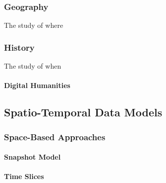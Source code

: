 \subsubsection{Geography} %
\label{ssub:geography}

The study of where



\subsubsection{History} %
\label{ssub:history}

The study of when


\paragraph{Digital Humanities} %
\label{par:digital_humanities}





\subsection{Spatio-Temporal Data Models} %
\label{sub:spatio_temporal_data_models}


\subsubsection{Space-Based Approaches} %
\label{ssub:space-based_approaches}


\paragraph{Snapshot Model} %
\label{par:snapshot_model}



\paragraph{Time Slices} %
\label{par:time_slices}

